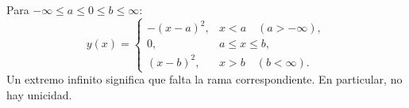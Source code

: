 Para $-\infty\le a\le0\le b\le\infty$:
\[y(x)=\begin{cases}-(x-a)^2,&x<a\quad(a> -\infty),\\0,&a\le x\le b,\\(x-b)^2,&x>b\quad(b<\infty).\end{cases}\]
Un extremo infinito significa que falta la rama correspondiente. En particular, no hay unicidad.
